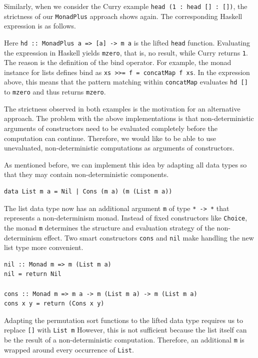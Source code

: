 \documentclass[a4paper, 11pt, fleqn, twoside]{scrreprt}
\newcommand{\hinl}[1]{\texttt{#1}}
\begin{document}
Similarly, when we consider the Curry example \hinl{head (1 : head [] : [])}, the strictness of our \hinl{MonadPlus} approach shows again.
The corresponding Haskell expression is as follows.


Here \hinl{hd :: MonadPlus a => [a] -> m a} is the lifted \hinl{head} function.
Evaluating the expression in Haskell yields \hinl{mzero}, that is, no result, while Curry returns \hinl{1}.
The reason is the definition of the bind operator.
For example, the monad instance for lists defines bind as \hinl{xs >>= f = concatMap f xs}.
In the expression above, this means that the pattern matching within \hinl{concatMap} evaluates \hinl{hd []} to \hinl{mzero} and thus returns \hinl{mzero}.

The strictness observed in both examples is the motivation for an alternative approach.
The problem with the above implementations is that non-deterministic arguments of constructors need to be evaluated completely before the computation can continue.
Therefore, we would like to be able to use unevaluated, non-deterministic computations as arguments of constructors.

As mentioned before, we can implement this idea by adapting all data types so that they may contain non-deterministic components.

\begin{verbatim}
data List m a = Nil | Cons (m a) (m (List m a))
\end{verbatim}

The list data type now has an additional argument \hinl{m} of type \hinl{* -> *} that represents a non-determinism monad.
Instead of fixed constructors like \hinl{Choice}, the monad \hinl{m} determines the structure and evaluation strategy of the non-determinism effect.
Two smart constructors \hinl{cons} and \hinl{nil} make handling the new list type more convenient.

\begin{verbatim}
nil :: Monad m => m (List m a)
nil = return Nil

cons :: Monad m => m a -> m (List m a) -> m (List m a)
cons x y = return (Cons x y)
\end{verbatim}

Adapting the permutation sort functions to the lifted data type requires us to replace \hinl{[]} with \hinl{List m} 
However, this is not sufficient because the list itself can be the result of a non-deterministic computation.
Therefore, an additional \hinl{m} is wrapped around every occurrence of \hinl{List}.
\end{document}
